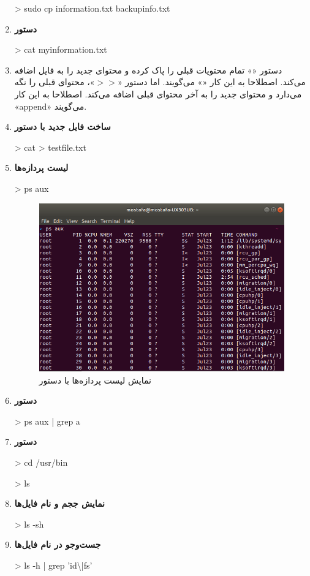 \begin{enumerate}
		\begin{code}
			> sudo cp information.txt backupinfo.txt
		\end{code}
	\item  
		\textbf{دستور }
		\begin{code}
			> cat myinformation.txt
		\end{code}
	\item دستور «\lr{>}» تمام محتویات قبلی را پاک کرده و محتوای جدید را به فایل اضافه می‌کند. اصطلاحا به این کار «» می‌گویند.
	 اما دستور «$>>$»، محتوای قبلی را نگه می‌دارد و محتوای جدید را به آخر محتوای قبلی اضافه می‌کند. اصطلاحا به این کار «append» می‌گویند.
	\item 
		\textbf{ساخت فایل جدید با دستور }
		\begin{code}
			> cat > testfile.txt
		\end{code}
	\item 
		\textbf{لیست پردازه‌ها}
		\begin{code}
			> ps aux
		\end{code}
		\begin{figure}[!h]
			\includegraphics[width=\linewidth]{9.png}
			\caption{نمایش لیست پردازه‌ها با دستور }
		\end{figure}
	\item 
		\textbf{دستور }
		\begin{code}
			> ps aux | grep a
		\end{code}
	
	\item 
		\textbf{دستور }
		\begin{code}
			> cd /usr/bin
			
			> ls
		\end{code}
	
	\item 
		\textbf{نمایش ججم و نام فایل‌ها}
		\begin{code}
			> ls -sh
		\end{code}
	\item 
		\textbf{جست‌وجو در نام فایل‌ها}
		\begin{code}
			> ls -h | grep 'id\textbackslash|fs'
		\end{code}
 
\end{enumerate}

